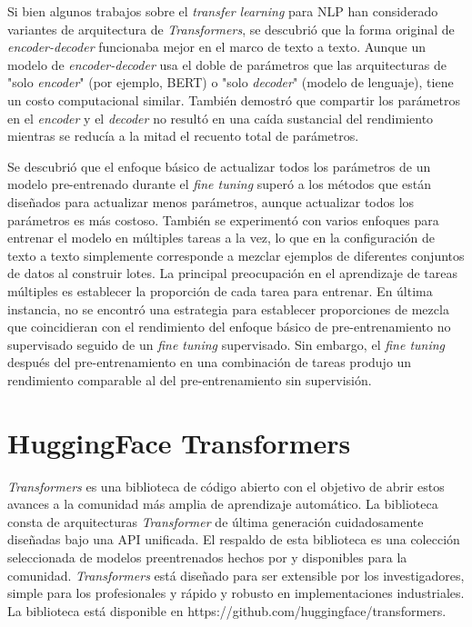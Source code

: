 Si bien algunos trabajos sobre el \textit{transfer learning} para NLP han considerado variantes de arquitectura de \textit{Transformers}, se descubrió que la forma original de \textit{encoder-decoder} funcionaba mejor en el marco de texto a texto. Aunque un modelo de \textit{encoder-decoder} usa el doble de parámetros que las arquitecturas de "solo \textit{encoder}" (por ejemplo, BERT) o "solo \textit{decoder}" (modelo de lenguaje), tiene un costo computacional similar. También demostró que compartir los parámetros en el \textit{encoder} y el \textit{decoder} no resultó en una caída sustancial del rendimiento mientras se reducía a la mitad el recuento total de parámetros.

Se descubrió que el enfoque básico de actualizar todos los parámetros de un modelo pre-entrenado durante el \textit{fine tuning} superó a los métodos que están diseñados para actualizar menos parámetros, aunque actualizar todos los parámetros es más costoso. También se experimentó con varios enfoques para entrenar el modelo en múltiples tareas a la vez, lo que en la configuración de texto a texto simplemente corresponde a mezclar ejemplos de diferentes conjuntos de datos al construir lotes. La principal preocupación en el aprendizaje de tareas múltiples es establecer la proporción de cada tarea para entrenar. En última instancia, no se encontró una estrategia para establecer proporciones de mezcla que coincidieran con el rendimiento del enfoque básico de pre-entrenamiento no supervisado seguido de un \textit{fine tuning} supervisado. Sin embargo, el \textit{fine tuning} después del pre-entrenamiento en una combinación de tareas produjo un rendimiento comparable al del pre-entrenamiento sin supervisión.

\section{HuggingFace Transformers}
\textit{Transformers} \parencite{95} es una biblioteca de código abierto con el objetivo de abrir estos avances a la comunidad más amplia de aprendizaje automático. La biblioteca consta de arquitecturas \textit{Transformer} de última generación cuidadosamente diseñadas bajo una API unificada. El respaldo de esta biblioteca es una colección seleccionada de modelos preentrenados hechos por y disponibles para la comunidad. \textit{Transformers} está diseñado para ser extensible por los investigadores, simple para los profesionales y rápido y robusto en implementaciones industriales. La biblioteca está disponible en https://github.com/huggingface/transformers.


